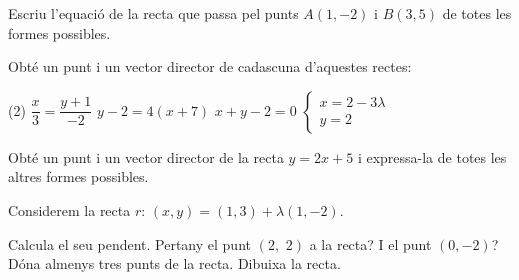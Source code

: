 \begin{mylist}
	\exer Escriu l'equació de la recta que passa pel punts $A(1,-2)$ i $B(3,5)$ de totes les formes possibles.
	
	\exer Obté un punt i un vector director de cadascuna d'aquestes rectes:
	\begin{tasks}(2)
		\task $\dfrac{x}{3}=\dfrac{y+1}{-2}$
		\task $y-2=4(x+7)$
		\task $x+y-2=0$
		\task $\left\{\begin{array}{l} x=2-3\lambda \\ y=2 \end{array}\right.$		
	\end{tasks}


	\exer Obté un punt i un vector director de la recta $y=2x+5$ i expressa-la de totes les altres formes possibles.
	
		
	\exer  Considerem la recta $r:\,  (x,y) = \left(1,3\right)+\lambda \left(1,-2\right)$.
	\begin{tasks}
		\task  Calcula el seu pendent.
		\task  Pertany el punt $\left(2,\, \, 2\right)$ a la recta? I el punt $\left(0,-2\right)$?
		\task  Dóna almenys tres punts de la recta.
		\task  Dibuixa la recta.
	\end{tasks}


\end{mylist}

